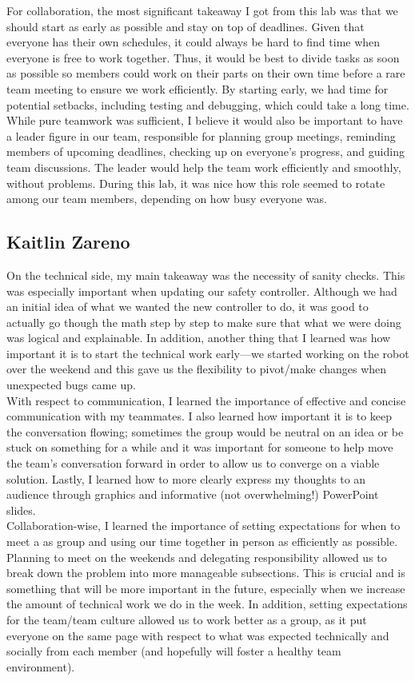 \documentclass{article}
\begin{document}
For collaboration, the most significant takeaway I got from this lab was that we should start as early as possible and stay on top of deadlines. Given that everyone has their own schedules, it could always be hard to find time when everyone is free to work together. Thus, it would be best to divide tasks as soon as possible so members could work on their parts on their own time before a rare team meeting to ensure we work efficiently. By starting early, we had time for potential setbacks, including testing and debugging, which could take a long time. While pure teamwork was sufficient, I believe it would also be important to have a leader figure in our team, responsible for planning group meetings, reminding members of upcoming deadlines, checking up on everyone's progress, and guiding team discussions. The leader would help the team work efficiently and smoothly, without problems. During this lab, it was nice how this role seemed to rotate among our team members, depending on how busy everyone was. \\

\subsection{Kaitlin Zareno}
On the technical side, my main takeaway was the necessity of sanity checks. This was especially important when updating our safety controller. Although we had an initial idea of what we wanted the new  controller to do, it was good to actually go though the math step by step to make sure that what we were doing was logical and explainable. In addition, another thing that I learned was how important it is to start the technical work early—we started working on the robot over the weekend and this gave us the flexibility to pivot/make changes when unexpected bugs came up.\\

With respect to communication, I learned the importance of effective and concise communication with my teammates. I also learned how important it is to keep the conversation flowing; sometimes the group would be neutral on an idea or be stuck on something for a while and it was important for someone to help move the team’s conversation forward in order to allow us to converge on a viable solution. Lastly, I learned how to more clearly express my thoughts to an audience through graphics and informative (not overwhelming!) PowerPoint slides.  \\

Collaboration-wise,  I learned the importance of setting expectations for when to meet a as group and using our time together in person as efficiently as possible. Planning to meet on the weekends and delegating responsibility allowed us to break down the problem into more manageable subsections. This is crucial and is something that will be more important in the future, especially when we increase the amount of technical work we do in the week. In addition, setting expectations for the team/team culture allowed us to work better as a group, as it put everyone on the same page with respect to what was expected technically and socially from each member (and hopefully will foster a healthy team environment). 
\end{document}
